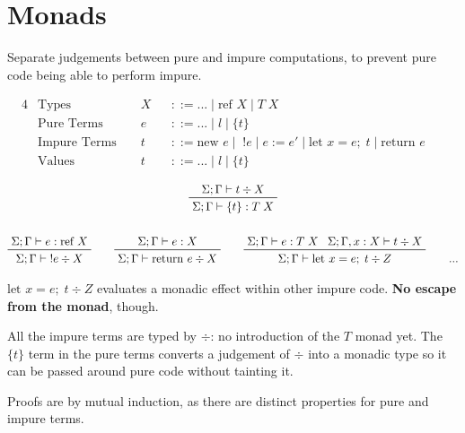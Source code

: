 \documentclass[11pt]{article}
\begin{document}
\section{Monads}
{
    Separate judgements between pure and impure computations, to prevent pure code being able to perform impure.

    \begin{alignat*}{4}
    &\text{Types } &&X &&::= ... \mid \text{ref }X \mid T\;X && \\
    &\text{Pure Terms } &&e &&::= ... \mid l \mid \{t\} && \\
    &\text{Impure Terms } &&t &&::= \text{new }e \mid \;!e \mid e:=e' \mid \text{let }x=e;\;t \mid \text{return }e && \\
    &\text{Values } &&t &&::= ... \mid l \mid \{t\} &&
    \end{alignat*}

    \begin{gather*}
    \prftree[r]{}
    {\Sigma;\Gamma\vdash t \div X}
    {\Sigma;\Gamma\vdash \{t\} : T\;X}
    \\
    \\
    \prftree[r]{}
    {\Sigma;\Gamma\vdash e : \text{ref }X}
    {\Sigma;\Gamma\vdash \;!e \div X}
    \qquad
    \prftree[r]{}
    {\Sigma;\Gamma\vdash e : X}
    {\Sigma;\Gamma\vdash \text{return }e \div X}
    \qquad
    \prftree[r]{}
    {\Sigma;\Gamma\vdash e : T\;X}
    {\Sigma;\Gamma,x:X \vdash t \div X}
    {\Sigma;\Gamma\vdash\text{let }x=e;\;t\div Z}
    \qquad
    ...
    \end{gather*}

    \(\text{let }x=e;\;t\div Z\) evaluates a monadic effect within other impure code. \textbf{No escape from the monad},
    though.

    All the impure terms are typed by \(\div\): no introduction of the \(T\) monad yet. The \(\{t\}\) term in the pure
    terms converts a judgement of \(\div\) into a monadic type so it can be passed around pure code without tainting it.

    Proofs are by mutual induction, as there are distinct properties for pure and impure terms.
}
\end{document}
